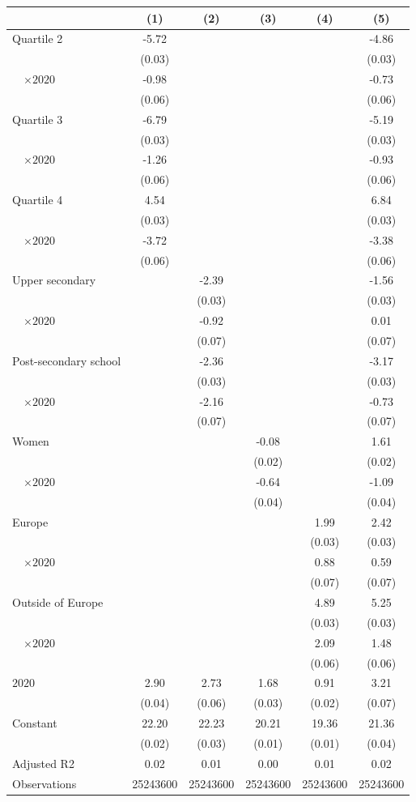 
\begin{tabular}{@{}l*{5}{S[table-format={-}2.2{\tnote{***}}]}@{}}
\toprule
{} & {(1)} & {(2)} & {(3)} & {(4)} & {(5)}\tabularnewline%
\midrule
Quartile 2 & -5.72\tnote{***} &  &  &  & -4.86\tnote{***}\tabularnewline%
 & (0.03) &  &  &  & \vphantom{2} (0.03)\tabularnewline%
~~\(\times 2020\) & -0.98\tnote{***} &  &  &  & -0.73\tnote{***}\tabularnewline%
 & (0.06) &  &  &  & \vphantom{2} (0.06)\tabularnewline%
Quartile 3 & -6.79\tnote{***} &  &  &  & -5.19\tnote{***}\tabularnewline%
 & (0.03) &  &  &  & \vphantom{1} (0.03)\tabularnewline%
~~\(\times 2020\) & -1.26\tnote{***} &  &  &  & -0.93\tnote{***}\tabularnewline%
 & (0.06) &  &  &  & \vphantom{1} (0.06)\tabularnewline%
Quartile 4 & 4.54\tnote{***} &  &  &  & 6.84\tnote{***}\tabularnewline%
 & (0.03) &  &  &  & (0.03)\tabularnewline%
~~\(\times 2020\) & -3.72\tnote{***} &  &  &  & -3.38\tnote{***}\tabularnewline%
 & (0.06) &  &  &  & (0.06)\tabularnewline%
Upper secondary &  & -2.39\tnote{***} &  &  & -1.56\tnote{***}\tabularnewline%
 &  & (0.03) &  &  & \vphantom{1} (0.03)\tabularnewline%
~~\(\times 2020\) &  & -0.92\tnote{***} &  &  & 0.01\tabularnewline%
 &  & (0.07) &  &  & \vphantom{1} (0.07)\tabularnewline%
Post-secondary school &  & -2.36\tnote{***} &  &  & -3.17\tnote{***}\tabularnewline%
 &  & (0.03) &  &  & (0.03)\tabularnewline%
~~\(\times 2020\) &  & -2.16\tnote{***} &  &  & -0.73\tnote{***}\tabularnewline%
 &  & (0.07) &  &  & (0.07)\tabularnewline%
Women &  &  & -0.08\tnote{***} &  & 1.61\tnote{***}\tabularnewline%
 &  &  & (0.02) &  & (0.02)\tabularnewline%
~~\(\times 2020\) &  &  & -0.64\tnote{***} &  & -1.09\tnote{***}\tabularnewline%
 &  &  & (0.04) &  & (0.04)\tabularnewline%
Europe &  &  &  & 1.99\tnote{***} & 2.42\tnote{***}\tabularnewline%
 &  &  &  & (0.03) & \vphantom{1} (0.03)\tabularnewline%
~~\(\times 2020\) &  &  &  & 0.88\tnote{***} & 0.59\tnote{***}\tabularnewline%
 &  &  &  & (0.07) & (0.07)\tabularnewline%
Outside of Europe &  &  &  & 4.89\tnote{***} & 5.25\tnote{***}\tabularnewline%
 &  &  &  & (0.03) & (0.03)\tabularnewline%
~~\(\times 2020\) &  &  &  & 2.09\tnote{***} & 1.48\tnote{***}\tabularnewline%
 &  &  &  & (0.06) & (0.06)\tabularnewline%
\midrule
\(2020\) & 2.90\tnote{***} & 2.73\tnote{***} & 1.68\tnote{***} & 0.91\tnote{***} & 3.21\tnote{***}\tabularnewline%
 & (0.04) & (0.06) & (0.03) & (0.02) & (0.07)\tabularnewline%
Constant & 22.20\tnote{***} & 22.23\tnote{***} & 20.21\tnote{***} & 19.36\tnote{***} & 21.36\tnote{***}\tabularnewline%
 & (0.02) & (0.03) & (0.01) & (0.01) & (0.04)\tabularnewline%
\midrule
Adjusted R2 & 0.02 & 0.01 & 0.00 & 0.01 & 0.02\tabularnewline%
Observations & {\num{25243600}} & {\num{25243600}} & {\num{25243600}} & {\num{25243600}} & {\num{25243600}}\tabularnewline%
\bottomrule
\end{tabular}
